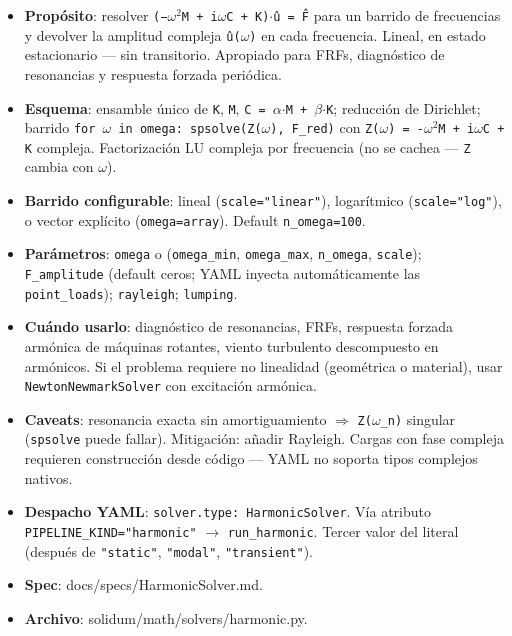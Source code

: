 \documentclass[11pt,letterpaper,oneside]{report}
\begin{document}
\begin{itemize}
  \item \textbf{Propósito}: resolver \texttt{(−\ensuremath{\omega}\ensuremath{^{2}}M + i\ensuremath{\omega}C + K)\ensuremath{\cdot}û = F̂} para un barrido de frecuencias y devolver la amplitud compleja \texttt{û(\ensuremath{\omega})} en cada frecuencia. Lineal, en estado estacionario --- sin transitorio. Apropiado para FRFs, diagnóstico de resonancias y respuesta forzada periódica.
  \item \textbf{Esquema}: ensamble único de \texttt{K}, \texttt{M}, \texttt{C = \ensuremath{\alpha}\ensuremath{\cdot}M + \ensuremath{\beta}\ensuremath{\cdot}K}; reducción de Dirichlet; barrido \texttt{for \ensuremath{\omega} in omega: spsolve(Z(\ensuremath{\omega}), F\_red)} con \texttt{Z(\ensuremath{\omega}) = -\ensuremath{\omega}\ensuremath{^{2}}M + i\ensuremath{\omega}C + K} compleja. Factorización LU compleja por frecuencia (no se cachea --- \texttt{Z} cambia con \texttt{\ensuremath{\omega}}).
  \item \textbf{Barrido configurable}: lineal (\texttt{scale="linear"}), logarítmico (\texttt{scale="log"}), o vector explícito (\texttt{omega=array}). Default \texttt{n\_omega=100}.
  \item \textbf{Parámetros}: \texttt{omega} o (\texttt{omega\_min}, \texttt{omega\_max}, \texttt{n\_omega}, \texttt{scale}); \texttt{F\_amplitude} (default ceros; YAML inyecta automáticamente las \texttt{point\_loads}); \texttt{rayleigh}; \texttt{lumping}.
  \item \textbf{Cuándo usarlo}: diagnóstico de resonancias, FRFs, respuesta forzada armónica de máquinas rotantes, viento turbulento descompuesto en armónicos. Si el problema requiere no linealidad (geométrica o material), usar \texttt{NewtonNewmarkSolver} con excitación armónica.
  \item \textbf{Caveats}: resonancia exacta sin amortiguamiento \ensuremath{\Rightarrow} \texttt{Z(\ensuremath{\omega}\_n)} singular (\texttt{spsolve} puede fallar). Mitigación: añadir Rayleigh. Cargas con fase compleja requieren construcción desde código --- YAML no soporta tipos complejos nativos.
  \item \textbf{Despacho YAML}: \texttt{solver.type: HarmonicSolver}. Vía atributo \texttt{PIPELINE\_KIND="harmonic"} \ensuremath{\to} \texttt{run\_harmonic}. Tercer valor del literal (después de \texttt{"static"}, \texttt{"modal"}, \texttt{"transient"}).
  \item \textbf{Spec}: docs/specs/HarmonicSolver.md.
  \item \textbf{Archivo}: solidum/math/solvers/harmonic.py.
\end{itemize}
\end{document}

